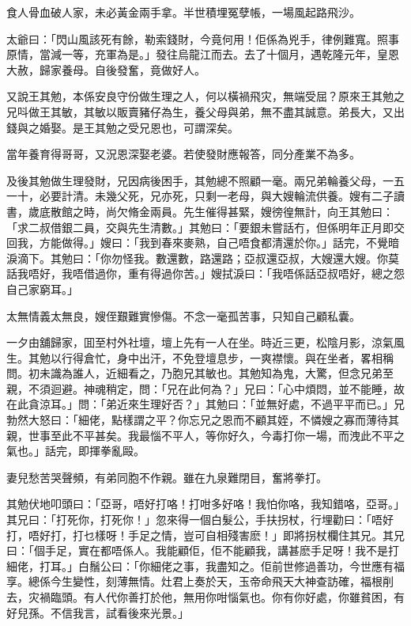 \documentclass[a5paper, 12pt, openany]{book} %
\begin{document}
	食人骨血破人家，未必黃金兩手拿。半世積埋冤孽帳，一場風起路飛沙。

	太爺曰：「閃山風該死有餘，勒索錢財，今竟何用！佢係為兇手，律例難寬。照事原情，當減一等，充軍為是。」發往烏龍江而去。去了十個月，遇乾隆元年，皇恩大赦，歸家養母。自後發奮，竟做好人。

	又說王其勉，本係安良守份做生理之人，何以橫禍飛灾，無端受屈？原來王其勉之兄呌做王其敏，其敏以販賣豬仔為生，養父母與弟，無不盡其誠意。弟長大，又出錢與之婚娶。是王其勉之受兄恩也，可謂深矣。

	當年養育得哥哥，又況恩深娶老婆。若使發財應報答，同分產業不為多。

	及後其勉做生理發財，兄因病後困手，其勉總不照顧一毫。兩兄弟輪養父母，一五一十，必要計清。未幾父死，兄亦死，只剩一老母，與大嫂輪流供養。嫂有二子讀書，歲底散館之時，尚欠脩金兩員。先生催得甚緊，嫂徬徨無計，向王其勉曰：「求二叔借銀二員，交與先生清數。」其勉曰：「要銀未嘗話冇，但係明年正月即交回我，方能做得。」嫂曰：「我到春來麥熟，自己唔食都清還於你。」話完，不覺暗淚滴下。其勉曰：「你勿怪我。數還數，路還路；亞叔還亞叔，大嫂還大嫂。你莫話我唔好，我唔借過你，重有得過你苦。」嫂拭淚曰：「我唔係話亞叔唔好，總之怨自己家窮耳。」

	太無情義太無良，嫂侄艱難實慘傷。不念一毫孤苦事，只知自己顧私囊。

	一夕由舖歸家，囬至村外社壇，壇上先有一人在坐。時近三更，松陰月影，涼氣風生。其勉以行得倉忙，身中出汗，不免登壇息步，一爽襟懷。與在坐者，畧相稱問。初未識為誰人，近細看之，乃胞兄其敏也。其勉知為鬼，大驚，但念兄弟至親，不須迴避。神魂稍定，問：「兄在此何為？」兄曰：「心中煩悶，並不能睡，故在此貪涼耳。」問：「弟近來生理好否？」其勉曰：「並無好處，不過平平而已。」兄勃然大怒曰：「細佬，點樣謂之平？你忘兄之恩而不顧其姪，不憐嫂之寡而薄待其親，世事至此不平甚矣。我最惱不平人，等你好久，今毒打你一場，而洩此不平之氣也。」話完，即揮拳亂毆。

	妻兒愁苦哭聲頻，有弟同胞不作親。雖在九泉難閉目，奮將拳打。

	其勉伏地叩頭曰：「亞哥，唔好打咯！打咁多好咯！我怕你咯，我知錯咯，亞哥。」其兄曰：「打死你，打死你！」忽來得一個白髮公，手扶拐杖，行埋勸曰：「唔好打，唔好打，打乜樣呀！手足之情，豈可自相殘害麽！」即將拐杖欄住其兄。其兄曰：「個手足，實在都唔係人。我能顧佢，佢不能顧我，講甚麽手足呀！我不是打細佬，打耳。」白鬚公曰：「你細佬之事，我盡知之。佢前世修過善功，今世應有福享。總係今生變性，刻薄無情。灶君上奏於天，玉帝命飛天大神查訪確，福根削去，灾禍臨頭。有人代你善打於他，無用你咁惱氣也。你有你好處，你雖貧困，有好兒孫。不信我言，試看後來光景。」
\end{document}
